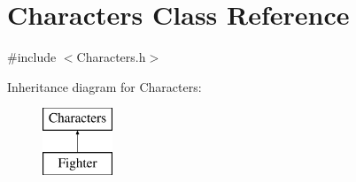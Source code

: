 \hypertarget{class_characters}{}\section{Characters Class Reference}
\label{class_characters}


{\ttfamily \#include $<$Characters.\+h$>$}

Inheritance diagram for Characters\+:\begin{figure}[H]
\begin{center}
\leavevmode
\includegraphics[height=2.000000cm]{class_characters}
\end{center}
\end{figure}
